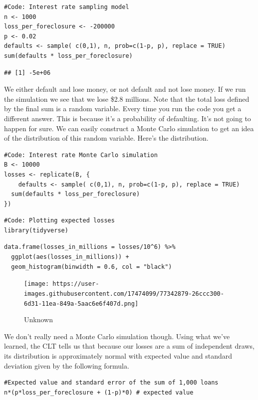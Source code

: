 \documentclass[
]{article}
\begin{document}
\begin{verbatim}
#Code: Interest rate sampling model
n <- 1000
loss_per_foreclosure <- -200000
p <- 0.02
defaults <- sample( c(0,1), n, prob=c(1-p, p), replace = TRUE)
sum(defaults * loss_per_foreclosure)
\end{verbatim}

\begin{verbatim}
## [1] -5e+06
\end{verbatim}

We either default and lose money, or not default and not lose money. If
we run the simulation we see that we lose \$2.8 millions. Note that the
total loss defined by the final sum is a random variable. Every time you
run the code you get a different answer. This is because it's a
probability of defaulting. It's not going to happen for sure. We can
easily construct a Monte Carlo simulation to get an idea of the
distribution of this random variable. Here's the distribution.

\begin{verbatim}
#Code: Interest rate Monte Carlo simulation
B <- 10000
losses <- replicate(B, {
    defaults <- sample( c(0,1), n, prob=c(1-p, p), replace = TRUE) 
  sum(defaults * loss_per_foreclosure)
})
\end{verbatim}

\begin{verbatim}
#Code: Plotting expected losses
library(tidyverse)
\end{verbatim}

\begin{verbatim}
data.frame(losses_in_millions = losses/10^6) %>%
  ggplot(aes(losses_in_millions)) +
  geom_histogram(binwidth = 0.6, col = "black")
\end{verbatim}

\begin{figure}
\centering
\texttt{[image: https://user-images.githubusercontent.com/17474099/77342879-26ccc300-6d31-11ea-849a-5aac6e6f407d.png]}
\caption{Unknown}
\end{figure}

We don't really need a Monte Carlo simulation though. Using what we've
learned, the CLT tells us that because our losses are a sum of
independent draws, its distribution is approximately normal with
expected value and standard deviation given by the following formula.

\begin{verbatim}
#Expected value and standard error of the sum of 1,000 loans
n*(p*loss_per_foreclosure + (1-p)*0) # expected value   
\end{verbatim}
\end{document}
